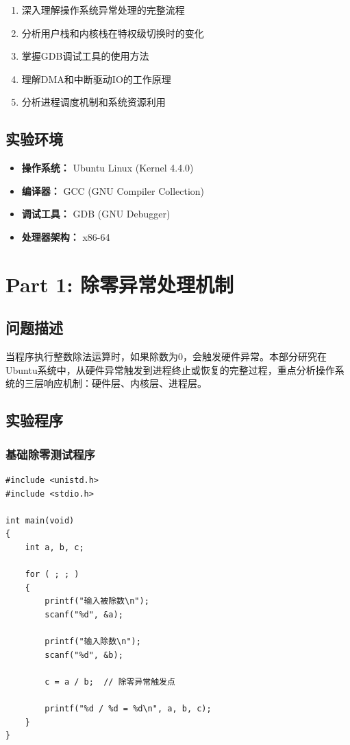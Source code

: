 \documentclass[UTF8,a4paper,12pt]{ctexart}
\begin{document}
\begin{enumerate}[leftmargin=2em]
    \item 深入理解操作系统异常处理的完整流程
    \item 分析用户栈和内核栈在特权级切换时的变化
    \item 掌握GDB调试工具的使用方法
    \item 理解DMA和中断驱动IO的工作原理
    \item 分析进程调度机制和系统资源利用
\end{enumerate}

\subsection{实验环境}

\begin{itemize}[leftmargin=2em]
    \item \textbf{操作系统：} Ubuntu Linux (Kernel 4.4.0)
    \item \textbf{编译器：} GCC (GNU Compiler Collection)
    \item \textbf{调试工具：} GDB (GNU Debugger)
    \item \textbf{处理器架构：} x86-64
\end{itemize}

\newpage

\section{Part 1: 除零异常处理机制}

\subsection{问题描述}

当程序执行整数除法运算时，如果除数为0，会触发硬件异常。本部分研究在Ubuntu系统中，从硬件异常触发到进程终止或恢复的完整过程，重点分析操作系统的三层响应机制：硬件层、内核层、进程层。

\subsection{实验程序}

\subsubsection{基础除零测试程序}

\begin{lstlisting}[style=cstyle,caption={division\_zero\_test.c - 基础除零程序}]
#include <unistd.h>
#include <stdio.h>

int main(void)
{
    int a, b, c;

    for ( ; ; )
    {
        printf("输入被除数\n");
        scanf("%d", &a);

        printf("输入除数\n");
        scanf("%d", &b);

        c = a / b;  // 除零异常触发点

        printf("%d / %d = %d\n", a, b, c);
    }
}
\end{lstlisting}
\end{document}
